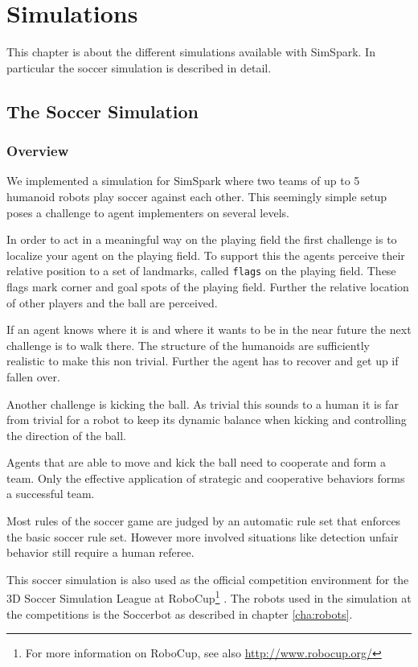 \chapter{Simulations}
\label{cha:simulations}

This chapter is about the different simulations available with
SimSpark. In particular the soccer simulation is described in detail.

\section{The Soccer Simulation}
\label{sec:soccersimulation}

\subsection{Overview}

We implemented a simulation for SimSpark where two teams of up to 5
humanoid robots play soccer against each other. This seemingly simple
setup poses a challenge to agent implementers on several levels.

In order to act in a meaningful way on the playing field the first
challenge is to localize your agent on the playing field. To support
this the agents perceive their relative position to a set of
landmarks, called \texttt{flags} on the playing field. These flags
mark corner and goal spots of the playing field. Further the relative
location of other players and the ball are perceived.

If an agent knows where it is and where it wants to be in the near
future the next challenge is to walk there. The structure of the
humanoids are sufficiently realistic to make this non trivial. Further
the agent has to recover and get up if fallen over.

Another challenge is kicking the ball. As trivial this sounds to a
human it is far from trivial for a robot to keep its dynamic balance
when kicking and controlling the direction of the ball.

Agents that are able to move and kick the ball need to cooperate and
form a team. Only the effective application of strategic and
cooperative behaviors forms a successful team.

Most rules of the soccer game are judged by an automatic rule set that
enforces the basic soccer rule set. However more involved situations
like detection unfair behavior still require a human referee.

This soccer simulation is also used as the official competition environment for the 3D Soccer Simulation League at RoboCup\footnote{For more information on RoboCup, see also \url{http://www.robocup.org/}} \cite{KAK+97}\cite{KA00}\cite{BMO+05}\cite{MBS+07}. The robots used in the simulation at the competitions is the Soccerbot as described in chapter \ref{cha:robots}.

